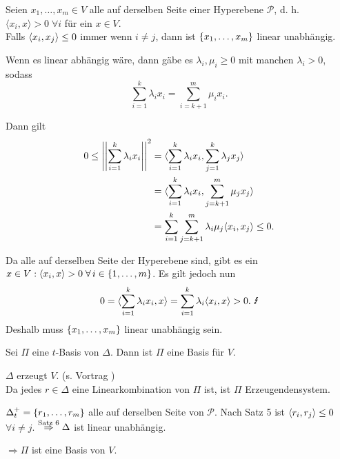 \documentclass{article}
\begin{document}
\begin{satz} %
    Seien \( x_1, \ldots, x_m \in V \) alle auf derselben 
    Seite einer Hyperebene \( \mathscr{P} \), 
    d. h. \( \langle x_i, x \rangle > 0 \;\forall i \) für 
    ein \( x\in V \). \\
    Falls \( \langle x_i, x_j \rangle \leq 0 \) immer wenn 
    \( i \neq j \), dann ist \( \{x_1, \ldots, x_m\} \) 
    linear unabhängig.
\end{satz}

\begin{bew}
    Wenn es linear abhängig wäre, dann gäbe es 
    \( \lambda_i, \mu_i \geq 0 \) mit 
    manchen \( \lambda_i > 0 \), sodass 
    \[ \sum_{i=1}^k \lambda_i x_i 
    = \sum_{i=k+1}^m \mu_i x_i. \]

    Dann gilt 
    \begin{align*}
        0 \leq \norm{\sum_{i=1}^k \lambda_i x_i}^2 
        &= \scalarprod{\sum_{i=1}^{k} \lambda_{i} x_{i}}{
        \sum_{j=1}^{k} \lambda_{j} x_{j}} \\
        &= \scalarprod{\sum_{i=1}^{k} \lambda_{i} x_{i}}{
        \sum_{j=k+1}^{m} \mu_{j} x_{j}} \\
        &= \sum_{i=1}^{k} \sum_{j=k+1}^{m} \lambda_{i} \mu_{j}
        \scalarprod{x_i}{x_j} 
        \leq 0. %
    \end{align*}

    Da alle auf derselben Seite der Hyperebene sind, 
    gibt es ein \( x \in V: \scalarprod{x_i}{x} > 0 
    \;\forall i \in \set{1,\ldots, m} \).
    Es gilt jedoch nun 
    \[ 0 = \scalarprod{\sum_{i=1}^{k} \lambda_i x_i}{x} 
    = \sum_{i=1}^k \lambda_i \scalarprod{x_i}{x} > 0. \text{ \Lightning{}} \]
    Deshalb muss \( \{x_1, \ldots, x_m\} \) linear 
    unabhängig sein.
\end{bew}

\begin{satz} %
    Sei \( \Pi \) eine \(t\)-Basis von \( \Delta \). Dann ist 
    \( \Pi \) eine Basis für \( V \).
\end{satz}
\begin{bew}
    \( \Delta \) erzeugt \( V \). (s. Vortrag )\\
    Da jedes \( r \in \Delta \) eine Linearkombination von \( \Pi \) ist, 
    ist \( \Pi \) Erzeugendensystem.

    \( \Delta_t^+ = \{r_1, \ldots, r_m\} \) alle auf derselben Seite 
    von \( \mathscr{P} \). Nach Satz 5 ist \( \langle r_i, r_j \rangle \leq 0 \)
    \( \forall i \neq j \). \( \overset{\text{Satz 6}}{\Rightarrow} \Delta \) 
    ist linear unabhängig.

    \( \Rightarrow \Pi \) ist eine Basis von \(V\).
\end{bew}
\end{document}
